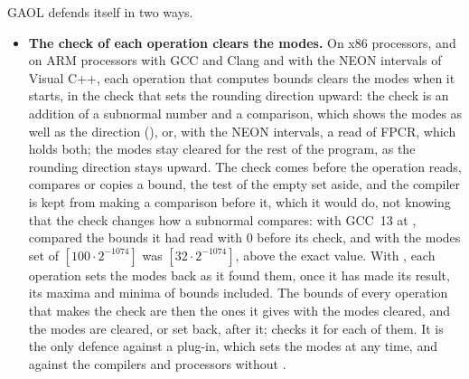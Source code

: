 \noindent
GAOL defends itself in two ways.
\begin{itemize}
\item[$\bullet$] \textbf{The check of each operation clears the modes.} On
  x86 processors, and on ARM processors with GCC and Clang and with the NEON
  intervals of Visual C++, each operation that computes bounds clears the
  modes when it starts, in the check that sets the rounding direction upward:
  the check is an addition of a subnormal number and a comparison, which shows
  the modes
  as well as the direction (), or, with the
  NEON intervals, a read of FPCR, which holds both; the modes stay cleared
  for the rest of the program, as the rounding direction stays upward. The
  check comes before the operation reads, compares or copies a bound, the
  test of the empty set aside, and the compiler is kept from making a
  comparison before it, which it would do, not knowing that the check changes
  how a subnormal compares: with GCC~13 at , 
  compared the bounds it had read with 0 before its check, and with the modes
  set  of $[100\cdot 2^{-1074}]$ was $[32\cdot 2^{-1074}]$,
  above the exact value. With , each
  operation sets the modes back as it found them, once it has made its
  result, its maxima and minima of bounds included. The bounds of every
  operation that makes the check are then the ones it gives with the modes
  cleared, and the modes are cleared, or set back, after it;\newinvfive{}  checks it for each of
  them. It is the only defence against a plug-in, which sets the modes at any
  time, and against the compilers and processors without
  .


\end{itemize}
